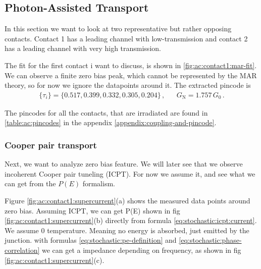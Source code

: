 
\subsection{Photon-Assisted Transport}
\label{subsec:ac:photon-assisted-transport}

    In this section we want to look at two representative but rather opposing contacts. Contact 1 has a leading channel with low-transmission and contact 2 has a leading channel with very high transmission.

    The fit for the first contact i want to discuss, is shown in \ref{fig:ac:contact1:mar-fit}. We can observe a finite zero bias peak, which cannot be represented by the MAR theory, so for now we ignore the datapoints around it.
    The extracted pincode is
    \begin{align}
        \{\tau_i\} = \{0.517, 0.399, 0.332, 0.305, 0.204\}\,, &&
        G_\mathrm{N} = 1.757\,G_0\,.
        \label{eq:ac:contact1:pincode}
    \end{align}


    The pincodes for all the contacts, that are irradiated are found in \ref{table:ac:pincodes} in the appendix \ref{appendix:coupling-and-pincode}.

    \subsubsection*{Cooper pair transport}

        Next, we want to analyze zero bias feature. We will later see that we observe incoherent Cooper pair tuneling (ICPT). For now we assume it, and see what we can get from the $P(E)$ formalism.

        Figure \ref{fig:ac:contact1:supercurrent}(a) shows the measured data points around zero bias. Assuming ICPT, we can get P(E) shown in fig \ref{fig:ac:contact1:supercurrent}(b) directly from formula \ref{eq:stochastic:icpt:current}. We assume 0 temperature. Meaning no energy is absorbed, just emitted by the junction. with formulas \ref{eq:stochastic:pe-definition} and \ref{eq:stochastic:phase-correlation} we can get a impedance depending on frequency, as shown in fig \ref{fig:ac:contact1:supercurrent}(c).

